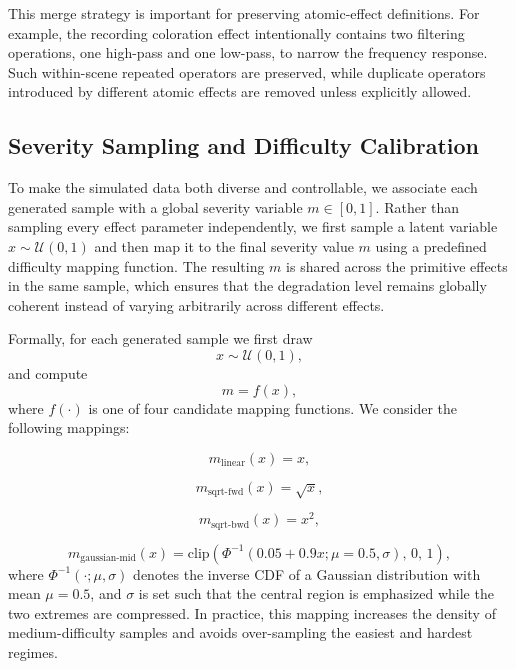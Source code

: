 \documentclass{llmxive}
\begin{document}
This merge strategy is important for preserving atomic-effect definitions. For
example, the recording coloration effect intentionally contains two
filtering operations, one high-pass and one low-pass, to narrow the frequency
response. Such within-scene repeated operators are preserved, while duplicate
operators introduced by different atomic effects are removed unless explicitly
allowed.

\subsection{Severity Sampling and Difficulty Calibration}

To make the simulated data both diverse and controllable, we associate each
generated sample with a global severity variable $m \in [0,1]$. Rather than
sampling every effect parameter independently, we first sample a latent variable
$x \sim \mathcal{U}(0,1)$ and then map it to the final severity value $m$ using
a predefined difficulty mapping function. The resulting $m$ is shared across the
primitive effects in the same sample, which ensures that the degradation level
remains globally coherent instead of varying arbitrarily across different
effects.

Formally, for each generated sample we first draw
\[
x \sim \mathcal{U}(0,1),
\]
and compute
\[
m = f(x),
\]
where $f(\cdot)$ is one of four candidate mapping functions. We consider the
following mappings:

\begin{equation}
m_{\text{linear}}(x) = x,
\end{equation}

\begin{equation}
m_{\text{sqrt-fwd}}(x) = \sqrt{x},
\end{equation}

\begin{equation}
m_{\text{sqrt-bwd}}(x) = x^2,
\end{equation}

\begin{equation}
m_{\text{gaussian-mid}}(x)
=
\mathrm{clip}\!\left(
\Phi^{-1}(0.05 + 0.9x; \mu=0.5,\sigma),
\,0,\,1
\right),
\end{equation}
where $\Phi^{-1}(\cdot;\mu,\sigma)$ denotes the inverse CDF of a Gaussian
distribution with mean $\mu=0.5$, and $\sigma$ is set such that the central
region is emphasized while the two extremes are compressed. In practice, this
mapping increases the density of medium-difficulty samples and avoids
over-sampling the easiest and hardest regimes.
\end{document}
